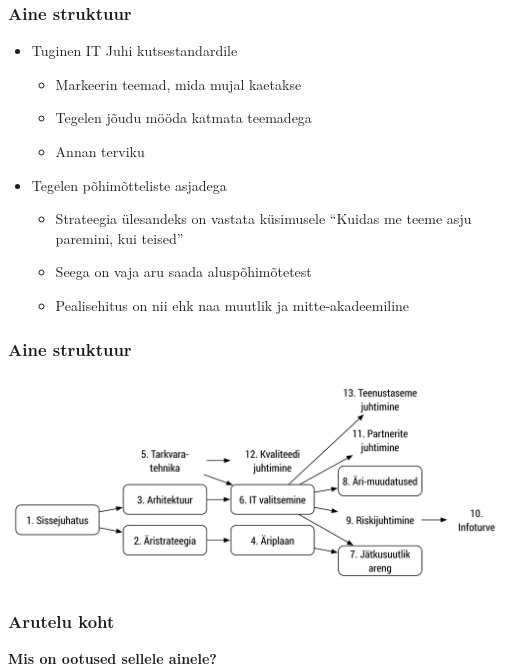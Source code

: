 \begin{frame}[fragile]
  \frametitle{Aine struktuur}
	\begin{itemize}
		\item Tuginen IT Juhi kutsestandardile \citep{kutsestandard}
			\begin{itemize}
				\item Markeerin teemad, mida mujal kaetakse
				\item Tegelen jõudu mööda katmata teemadega
				\item Annan terviku
			\end{itemize}
		\item Tegelen põhimõtteliste asjadega
			\begin{itemize}
				\item Strateegia ülesandeks on vastata küsimusele “Kuidas me teeme asju paremini, kui teised” \citep{de2006strategy}	
				\item Seega on vaja aru saada aluspõhimõtetest
				\item Pealisehitus on nii ehk naa muutlik ja mitte-akadeemiline
			\end{itemize}
	\end{itemize}
\end{frame}

\begin{frame}[fragile]
  \frametitle{Aine struktuur}
		\includegraphics[width=\textwidth]{aine_struktuur.pdf}
\end{frame}

\begin{frame}[fragile]
  \frametitle{Arutelu koht}
		\begin{center}
			\textbf{Mis on ootused sellele ainele?}
		\end{center}
\end{frame}
		
